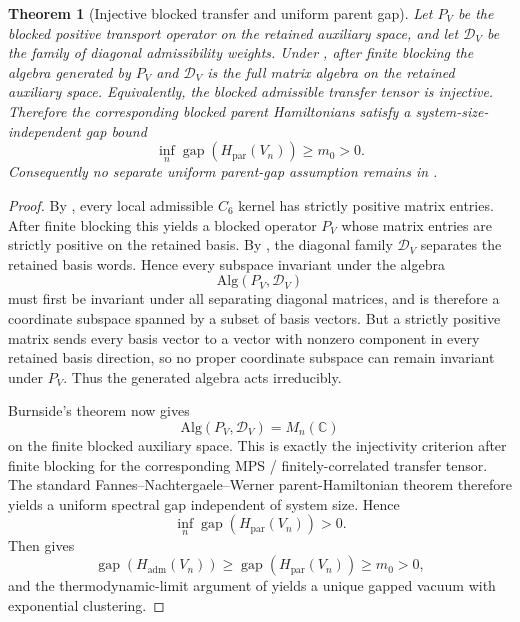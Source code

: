 \documentclass[11pt,a4paper]{article}
\newtheorem{theorem}{Theorem}[section]
\theoremstyle{definition}
\theoremstyle{remark}
\begin{document}
\begin{theorem}[Injective blocked transfer and uniform parent gap]
\label{thm:uniform-parent-gap-injective}
Let $P_V$ be the blocked positive transport operator on the retained auxiliary space, and let
$\mathcal D_V$ be the family of diagonal admissibility weights. Under
, after finite blocking the
algebra generated by $P_V$ and $\mathcal D_V$ is the full matrix algebra on the retained auxiliary
space. Equivalently, the blocked admissible transfer tensor is injective. Therefore the
corresponding blocked parent Hamiltonians satisfy a system-size-independent gap bound
\[
\inf_n \operatorname{gap}(H_{\mathrm{par}}(V_n))\ge m_0>0.
\]
Consequently no separate uniform parent-gap assumption remains in
.
\end{theorem}

\begin{proof}
By , every local admissible $C_6$ kernel has strictly positive
matrix entries. After finite blocking this yields a blocked operator $P_V$ whose matrix entries are
strictly positive on the retained basis. By
, the diagonal family $\mathcal D_V$ separates the
retained basis words. Hence every subspace invariant under the algebra
\[
\mathrm{Alg}(P_V,\mathcal D_V)
\]
must first be invariant under all separating diagonal matrices, and is therefore a coordinate
subspace spanned by a subset of basis vectors. But a strictly positive matrix sends every basis
vector to a vector with nonzero component in every retained basis direction, so no proper
coordinate subspace can remain invariant under $P_V$. Thus the generated algebra acts irreducibly.

Burnside's theorem now gives
\[
\mathrm{Alg}(P_V,\mathcal D_V)=M_n(\mathbb C)
\]
on the finite blocked auxiliary space. This is exactly the injectivity criterion after finite
blocking for the corresponding MPS / finitely-correlated transfer tensor. The standard
Fannes--Nachtergaele--Werner parent-Hamiltonian theorem therefore yields a uniform spectral gap
independent of system size. Hence
\[
\inf_n \operatorname{gap}(H_{\mathrm{par}}(V_n))>0.
\]
Then  gives
\[
\operatorname{gap}(H_{\mathrm{adm}}(V_n))
\ge
\operatorname{gap}(H_{\mathrm{par}}(V_n))
\ge
m_0>0,
\]
and the thermodynamic-limit argument of  yields a unique gapped vacuum
with exponential clustering.
\end{proof}
\end{document}
